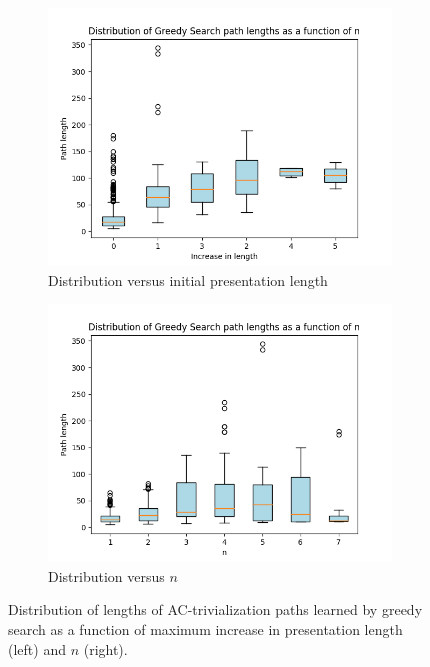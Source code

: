 \begin{figure}
	\centering
	\begin{subfigure}[b]{0.4\textwidth}
		\includegraphics[width=\textwidth]{fig/path_lengths_vs_length_increase.png}
		\caption{Distribution versus initial presentation length}
		\label{fig:path_lengths_vs_length_increase}
	\end{subfigure}
	\begin{subfigure}[b]{0.4\textwidth}
		\centering
		\includegraphics[width=1.1\textwidth]{fig/gs_path_lengths.png}
		\caption{Distribution versus $n$}
		\label{fig:gs_path_lengths}
	\end{subfigure}%
	\caption{Distribution of lengths of AC-trivialization paths learned by greedy search as a function of maximum increase in presentation length (left) and $n$ (right).} \label{fig:gs_path_length}
\end{figure}

